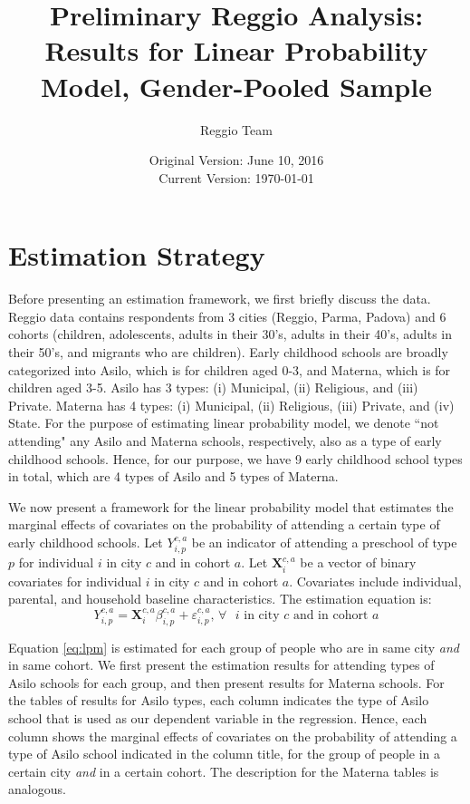 \documentclass[12pt]{article}
\begin{document}
\title{Preliminary Reggio Analysis: Results for Linear Probability Model, Gender-Pooled Sample}
\author{Reggio Team}
\date{Original Version: June 10, 2016 \\ Current Version: \today}
\maketitle 

\section{Estimation Strategy}
\doublespacing
Before presenting an estimation framework, we first briefly discuss the data. Reggio data contains respondents from 3 cities (Reggio, Parma, Padova) and 6 cohorts (children, adolescents, adults in their 30's, adults in their 40's, adults in their 50's, and migrants who are children). Early childhood schools are broadly categorized into Asilo, which is for children aged 0-3, and Materna, which is for children aged 3-5. Asilo has 3 types: (i) Municipal, (ii) Religious, and (iii) Private. Materna has 4 types: (i) Municipal, (ii) Religious, (iii) Private, and (iv) State. For the purpose of estimating linear probability model, we denote ``not attending" any Asilo and Materna schools, respectively, also as a type of early childhood schools. Hence, for our purpose, we have 9 early childhood school types in total, which are 4 types of Asilo and 5 types of Materna. 

We now present a framework for the linear probability model that estimates the  marginal effects of covariates on the probability of attending a certain type of early childhood schools. Let $Y_{i,p}^{c,a}$ be an indicator of attending a preschool of type $p$ for individual $i$ in city $c$ and in cohort $a$. Let $\mathbf{X}_{i}^{c,a}$ be a vector of binary covariates for individual $i$ in city $c$ and in cohort $a$. Covariates include individual, parental, and household baseline characteristics. The estimation equation is:
\begin{equation} \label{eq:lpm}
Y_{i,p}^{c,a} = \mathbf{X}_{i}^{c,a}\beta_{i,p}^{c,a} + \varepsilon_{i,p}^{c,a} \text{, $\forall$ $i$ in city $c$ and in cohort $a$}
\end{equation}

Equation \ref{eq:lpm} is estimated for each group of people who are in same city \textit{and} in same cohort. We first present the estimation results for attending types of Asilo schools for each group, and then present results for Materna schools. For the tables of results for Asilo types, each column indicates the type of Asilo school that is used as our dependent variable in the regression. Hence, each column shows the marginal effects of covariates on the probability of attending a type of Asilo school indicated in the column title, for the group of people in a certain city \textit{and} in a certain cohort. The description for the Materna tables is analogous. 
\end{document}
